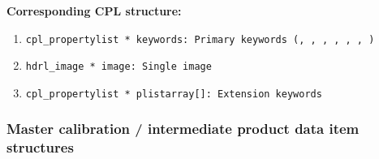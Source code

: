 \begin{handdatastructdef}
\textbf{Corresponding \ac{CPL} structure:}
\begin{enumerate}
    \item \texttt{cpl\_propertylist * keywords: Primary keywords (,  ,  ,  ,  ,  , )}
    \item \texttt{hdrl\_image * image: Single image}
    \item \texttt{cpl\_propertylist * plistarray[]: Extension keywords}
\end{enumerate}
\end{handdatastructdef}







\subsubsection{Master calibration / intermediate product data item structures}\label{sssec:imgprocdatastructs}




















